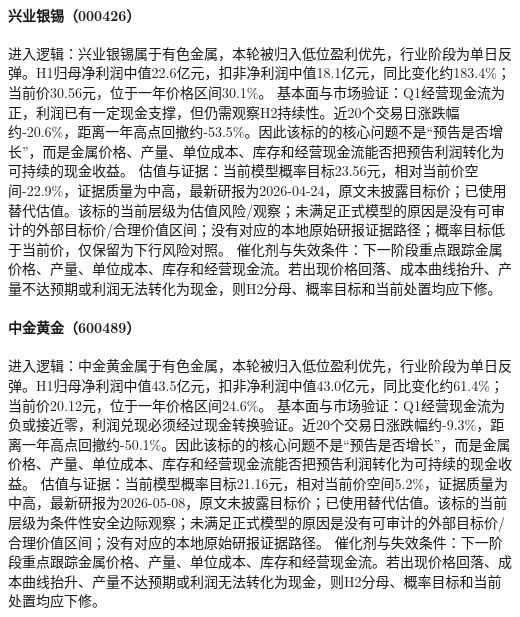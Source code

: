 \paragraph{兴业银锡（000426）}
进入逻辑：兴业银锡属于有色金属，本轮被归入低位盈利优先，行业阶段为单日反弹。H1归母净利润中值22.6亿元，扣非净利润中值18.1亿元，同比变化约183.4\%；当前价30.56元，位于一年价格区间30.1\%。
基本面与市场验证：Q1经营现金流为正，利润已有一定现金支撑，但仍需观察H2持续性。近20个交易日涨跌幅约-20.6\%，距离一年高点回撤约-53.5\%。因此该标的的核心问题不是“预告是否增长”，而是金属价格、产量、单位成本、库存和经营现金流能否把预告利润转化为可持续的现金收益。
估值与证据：当前模型概率目标23.56元，相对当前价空间-22.9\%，证据质量为中高，最新研报为2026-04-24，原文未披露目标价；已使用替代估值。该标的当前层级为估值风险/观察；未满足正式模型的原因是没有可审计的外部目标价/合理价值区间；没有对应的本地原始研报证据路径；概率目标低于当前价，仅保留为下行风险对照。
催化剂与失效条件：下一阶段重点跟踪金属价格、产量、单位成本、库存和经营现金流。若出现价格回落、成本曲线抬升、产量不达预期或利润无法转化为现金，则H2分母、概率目标和当前处置均应下修。

\paragraph{中金黄金（600489）}
进入逻辑：中金黄金属于有色金属，本轮被归入低位盈利优先，行业阶段为单日反弹。H1归母净利润中值43.5亿元，扣非净利润中值43.0亿元，同比变化约61.4\%；当前价20.12元，位于一年价格区间24.6\%。
基本面与市场验证：Q1经营现金流为负或接近零，利润兑现必须经过现金转换验证。近20个交易日涨跌幅约-9.3\%，距离一年高点回撤约-50.1\%。因此该标的的核心问题不是“预告是否增长”，而是金属价格、产量、单位成本、库存和经营现金流能否把预告利润转化为可持续的现金收益。
估值与证据：当前模型概率目标21.16元，相对当前价空间5.2\%，证据质量为中高，最新研报为2026-05-08，原文未披露目标价；已使用替代估值。该标的当前层级为条件性安全边际观察；未满足正式模型的原因是没有可审计的外部目标价/合理价值区间；没有对应的本地原始研报证据路径。
催化剂与失效条件：下一阶段重点跟踪金属价格、产量、单位成本、库存和经营现金流。若出现价格回落、成本曲线抬升、产量不达预期或利润无法转化为现金，则H2分母、概率目标和当前处置均应下修。

